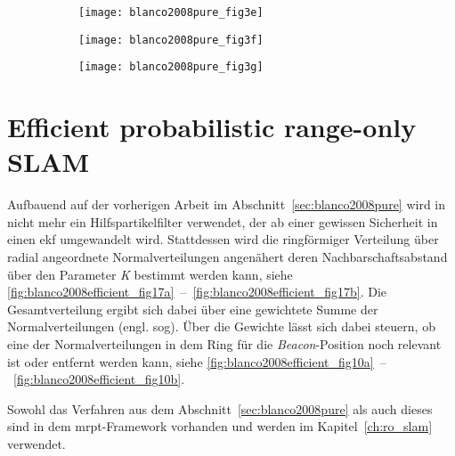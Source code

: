 \begin{figure}
	\begin{subfigure}[t]{0.3\linewidth}
		\texttt{[image: blanco2008pure\_fig3e]}
		\caption{}
		\label{fig:blanco2008pure_fig3e}
	\end{subfigure}
	\hfill
	\begin{subfigure}[t]{0.3\linewidth}
		\texttt{[image: blanco2008pure\_fig3f]}
		\caption{}
		\label{fig:blanco2008pure_fig3f}
	\end{subfigure}
	\hfill
	\begin{subfigure}[t]{0.3\linewidth}
		\texttt{[image: blanco2008pure\_fig3g]}
		\caption{}
		\label{fig:blanco2008pure_fig3g}
	\end{subfigure}
	\label{fig:blanco2008pure_fig3}
\end{figure}


%
%
\section{Efficient probabilistic range-only SLAM}\label{sec:blanco2008efficient}

Aufbauend auf der vorherigen Arbeit im Abschnitt~\ref{sec:blanco2008pure} wird in  \cite{blanco2008efficient} nicht mehr ein Hilfspartikelfilter verwendet, der ab einer gewissen Sicherheit in einen \Gls{ekf} umgewandelt wird. Stattdessen wird die ringförmiger Verteilung über radial angeordnete Normalverteilungen angenähert deren Nachbarschaftsabstand über den Parameter \textit{K} bestimmt werden kann, siehe \autoref{fig:blanco2008efficient_fig17a}~--~\ref{fig:blanco2008efficient_fig17b}. Die Gesamtverteilung ergibt sich dabei über eine gewichtete Summe der Normalverteilungen (engl. \gls{sog}). Über die Gewichte lässt sich dabei steuern, ob eine der Normalverteilungen in dem Ring für die \textit{Beacon}-Position noch relevant ist oder entfernt werden kann, siehe \autoref{fig:blanco2008efficient_fig10a}~--~\ref{fig:blanco2008efficient_fig10b}.

Sowohl das Verfahren aus dem Abschnitt~\ref{sec:blanco2008pure} als auch dieses sind in dem \Gls{mrpt}-Framework vorhanden und werden im Kapitel~\ref{ch:ro_slam} verwendet.

